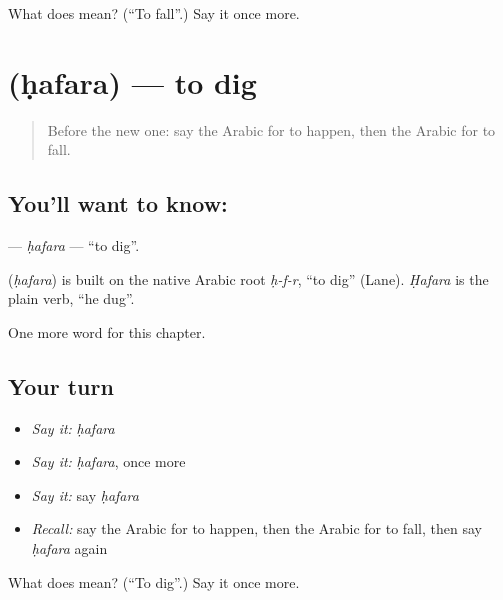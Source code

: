 \begin{tcolorbox}[breakable,colback=teal!4,colframe=teal!35!black,title={Before you move on}]
What does  mean? (\textquotedblleft{}To fall\textquotedblright{}.) Say it once more.
\end{tcolorbox}
\section[\texorpdfstring{\ar{حفر} (ḥafara)}{حفر (ḥafara)}]{ (ḥafara) — to dig}

\label{lesson:AR-C198-hafara}



\begin{quote}
Before the new one: say the Arabic for to happen, then the Arabic for to fall.
\end{quote}

\subsection*{You'll want to know: }
\textbf{} — \emph{ḥafara} — \textquotedblleft{}to dig\textquotedblright{}.

\begin{cousinweb}
\textbf{} (\emph{ḥafara}) is built on the native Arabic root \emph{ḥ-f-r}, \textquotedblleft{}to dig\textquotedblright{} (Lane). \emph{Ḥafara} is the plain verb, \textquotedblleft{}he dug\textquotedblright{}.
\end{cousinweb}

\begin{grammarlens}[title={What you've built}]
One more word for this chapter.
\end{grammarlens}

\subsection*{Your turn}
\begin{itemize}
\raggedright
  \item \emph{Say it:} \emph{ḥafara}
  \item \emph{Say it:} \emph{ḥafara}, once more
  \item \emph{Say it:} say \emph{ḥafara}
  \item \emph{Recall:} say the Arabic for to happen, then the Arabic for to fall, then say \emph{ḥafara} again
\end{itemize}

\begin{tcolorbox}[breakable,colback=teal!4,colframe=teal!35!black,title={Before you move on}]
What does  mean? (\textquotedblleft{}To dig\textquotedblright{}.) Say it once more.
\end{tcolorbox}
